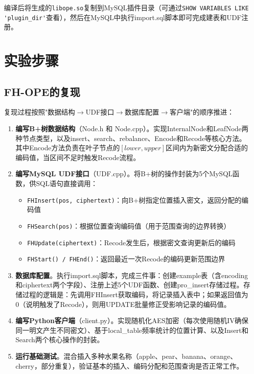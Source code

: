 \documentclass[a4paper]{article}
\begin{document}
编译后将生成的\texttt{libope.so}复制到MySQL插件目录（可通过\lstinline|SHOW VARIABLES LIKE 'plugin_dir'|查看），然后在MySQL中执行import.sql脚本即可完成建表和UDF注册。

\section{实验步骤}

\subsection{FH-OPE的复现}

复现过程按照"数据结构$\rightarrow$UDF接口$\rightarrow$数据库配置$\rightarrow$客户端"的顺序推进：

\begin{enumerate}
    \item \textbf{编写B+树数据结构}（Node.h 和 Node.cpp）。实现InternalNode和LeafNode两种节点类型，以及insert、search、rebalance、Encode和Recode等核心方法。其中Encode方法负责在叶子节点的$[lower, upper]$区间内为新密文分配合适的编码值，当区间不足时触发Recode流程。

    \item \textbf{编写MySQL UDF接口}（UDF.cpp）。将B+树的操作封装为5个MySQL函数，供SQL语句直接调用：
    \begin{itemize}
        \item \texttt{FHInsert(pos, ciphertext)}：向B+树指定位置插入密文，返回分配的编码值
        \item \texttt{FHSearch(pos)}：根据位置查询编码值（用于范围查询的边界转换）
        \item \texttt{FHUpdate(ciphertext)}：Recode发生后，根据密文查询更新后的编码
        \item \texttt{FHStart() / FHEnd()}：返回最近一次Recode的编码更新范围边界
    \end{itemize}

    \item \textbf{数据库配置}。执行import.sql脚本，完成三件事：创建example表（含encoding和ciphertext两个字段）、注册上述5个UDF函数、创建pro\_insert存储过程。存储过程的逻辑是：先调用FHInsert获取编码，将记录插入表中；如果返回值为0（说明触发了Recode），则用UPDATE批量修正受影响记录的编码值。

    \item \textbf{编写Python客户端}（client.py）。实现随机化AES加密（每次使用随机IV确保同一明文产生不同密文）、基于local\_table频率统计的位置计算、以及Insert和Search两个核心操作的封装。

    \item \textbf{运行基础测试}。混合插入多种水果名称（apple、pear、banana、orange、cherry，部分重复），验证基本的插入、编码分配和范围查询是否正常工作。
\end{enumerate}
\end{document}
